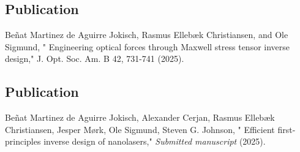 \vspace*{0.4\textheight}
\begin{center}
  \begin{minipage}{0.9\linewidth}
    \section*{Publication \cite{ownpub2}}
    Beñat Martinez de Aguirre Jokisch, Rasmus Ellebæk Christiansen, and Ole Sigmund, "
    Engineering optical forces through Maxwell stress tensor inverse design,"  J. Opt. Soc. Am. B 42, 731-741 (2025).
  \end{minipage}
\end{center}
\newpage


\vspace*{0.4\textheight}
\begin{center}
  \begin{minipage}{0.9\linewidth}
    \section*{Publication \cite{ownpub4}}
    Beñat Martinez de Aguirre Jokisch, Alexander Cerjan, Rasmus Ellebæk Christiansen, Jesper Mørk, Ole Sigmund, Steven G. Johnson, "
    Efficient first-principles inverse design of nanolasers,"  \textit{Submitted manuscript} (2025).
  \end{minipage}
\end{center}
\newpage


%

